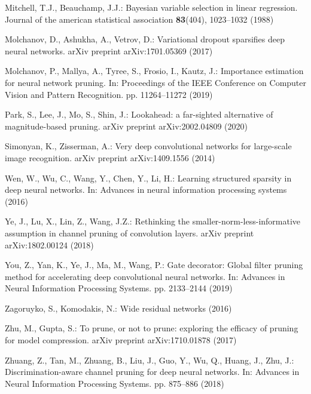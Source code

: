 \documentclass[runningheads, envcountsame, a4paper]{llncs}
\begin{document}
\begin{thebibliography}{10}
  Mitchell, T.J., Beauchamp, J.J.: Bayesian variable selection in linear
    regression. Journal of the american statistical association
    \textbf{83}(404),  1023--1032 (1988)
  
  Molchanov, D., Ashukha, A., Vetrov, D.: Variational dropout sparsifies deep
    neural networks. arXiv preprint arXiv:1701.05369  (2017)
  
  Molchanov, P., Mallya, A., Tyree, S., Frosio, I., Kautz, J.: Importance
    estimation for neural network pruning. In: Proceedings of the IEEE Conference
    on Computer Vision and Pattern Recognition. pp. 11264--11272 (2019)
  
  Park, S., Lee, J., Mo, S., Shin, J.: Lookahead: a far-sighted alternative of
    magnitude-based pruning. arXiv preprint arXiv:2002.04809  (2020)
  
  Simonyan, K., Zisserman, A.: Very deep convolutional networks for large-scale
    image recognition. arXiv preprint arXiv:1409.1556  (2014)
  
  Wen, W., Wu, C., Wang, Y., Chen, Y., Li, H.: Learning structured sparsity in
    deep neural networks. In: Advances in neural information processing systems
    (2016)
  
  Ye, J., Lu, X., Lin, Z., Wang, J.Z.: Rethinking the
    smaller-norm-less-informative assumption in channel pruning of convolution
    layers. arXiv preprint arXiv:1802.00124  (2018)
  
  You, Z., Yan, K., Ye, J., Ma, M., Wang, P.: Gate decorator: Global filter
    pruning method for accelerating deep convolutional neural networks. In:
    Advances in Neural Information Processing Systems. pp. 2133--2144 (2019)
  
  Zagoruyko, S., Komodakis, N.: Wide residual networks  (2016)
  
  Zhu, M., Gupta, S.: To prune, or not to prune: exploring the efficacy of
    pruning for model compression. arXiv preprint arXiv:1710.01878  (2017)
  
  Zhuang, Z., Tan, M., Zhuang, B., Liu, J., Guo, Y., Wu, Q., Huang, J., Zhu, J.:
    Discrimination-aware channel pruning for deep neural networks. In: Advances
    in Neural Information Processing Systems. pp. 875--886 (2018)
  


\end{thebibliography}
\end{document}

